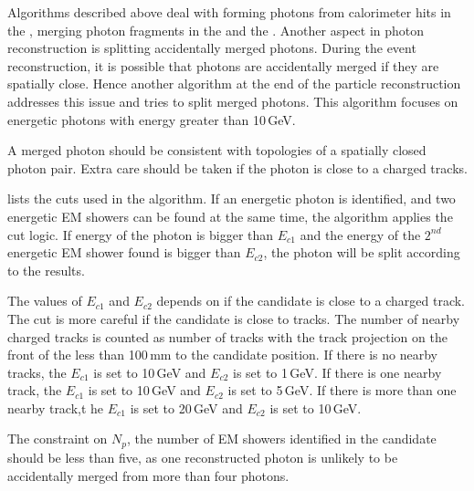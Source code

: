 Algorithms described above deal with forming photons from calorimeter hits in the \ECAL, merging photon fragments in the \ECAL and the \HCAL. Another aspect in photon reconstruction is splitting accidentally merged photons. During the event reconstruction, it is possible that photons are accidentally merged if they are spatially close. Hence another algorithm at the end of the particle reconstruction addresses this issue and tries to split merged photons. This algorithm focuses on energetic photons with energy greater than 10\,GeV.

A merged photon should be consistent with topologies of a spatially closed photon pair. Extra care should be taken if the photon is close to a charged tracks.


 lists the cuts used in the algorithm.  If an energetic photon is identified, and two energetic EM showers  can be found at the same time, the algorithm applies the cut logic. If energy of the photon is bigger than $E_{c1}$ and the energy of the $2^{nd}$ energetic EM shower found is bigger than $E_{c2}$, the photon will be split according to the \peakFinding results. 

The values of $E_{c1}$ and $E_{c2}$ depends on if the candidate is close to a charged track. The cut is more careful if the candidate is close to tracks. The number of nearby charged tracks is counted as number of tracks with the track projection on the front of the \ECAL less than 100\,mm to the candidate position. If there is no nearby tracks, the $E_{c1}$ is set to 10\,GeV and $E_{c2}$ is set to 1\,GeV. If there is one nearby track, the $E_{c1}$ is set to 10\,GeV and $E_{c2}$ is set to 5\,GeV. If there is more than one nearby track,t he $E_{c1}$ is set to 20\,GeV and $E_{c2}$ is set to 10\,GeV.


The constraint on $N_{p}$, the number of EM showers identified in the candidate should be less than five, as one reconstructed photon is unlikely to be accidentally merged from more than four photons.



